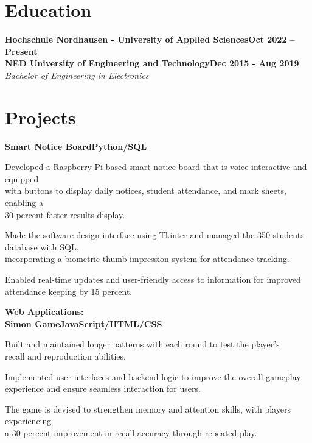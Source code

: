 \documentclass[letterpaper,10pt]{article}
\newcommand{\heading}[2]{
  \hspace{10pt}#1\hfill#2\\
}
\newcommand{\headingBf}[2]{
  \heading{\textbf{#1}}{\textbf{#2}}
}
\newcommand{\headingIt}[2]{
  \heading{\textit{#1}}{\textit{#2}}
}
\newenvironment{resume_list}{
  \vspace{-7pt}
  \begin{itemize}[itemsep=-2px, parsep=1pt, leftmargin=30pt]
}{
  \end{itemize}
}
\begin{document}

\section{Education}

\headingBf{Hochschule Nordhausen - University of Applied Sciences}{Oct 2022 -- Present}




\headingBf{NED University of Engineering and Technology}{Dec 2015 - Aug 2019} %
\headingIt{Bachelor of Engineering in Electronics}{}





\section{Projects}

\headingBf{Smart Notice Board}{Python/SQL}
\begin{resume_list}
    \item Developed a Raspberry Pi-based smart notice board that is voice-interactive and equipped \\with buttons to display daily notices, student attendance, and mark sheets, enabling a \\30 percent faster results display.
    \item Made the software design interface using Tkinter and managed the 350  students database with SQL,\\ incorporating a biometric thumb impression system for attendance tracking.
    \item Enabled real-time updates and user-friendly access to information for improved \\ attendance keeping by 15 percent.
\end{resume_list}


\headingBf{Web Applications:}{}

\headingBf{Simon Game}{JavaScript/HTML/CSS}
\begin{resume_list}
    \item Built and maintained longer patterns with each round to test the player's\\ recall and reproduction abilities.
    \item Implemented user interfaces and backend logic to improve the overall gameplay\\ experience and ensure seamless interaction for users.
    \item The game is devised to strengthen memory and attention skills, with players experiencing \\a 30 percent improvement in recall accuracy through repeated play.
\end{resume_list}
\end{document}
